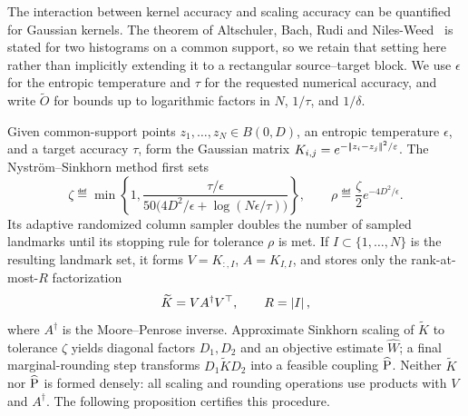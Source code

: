 The interaction between kernel accuracy and scaling accuracy can be quantified for Gaussian kernels. The theorem of Altschuler, Bach, Rudi and Niles-Weed~\cite{AltschulerBachRudiWeed2018QuadraticTransport,AltschulerBachRudiNilesWeed2019NystromSinkhorn} is stated for two histograms on a common support, so we retain that setting here rather than implicitly extending it to a rectangular source--target block. We use \(\epsilon\) for the entropic temperature and \(\tau\) for the requested numerical accuracy, and write \(\widetilde O\) for bounds up to logarithmic factors in \(N\), \(1/\tau\), and \(1/\delta\).

Given common-support points \(z_1,\ldots,z_N\in B(0,D)\), an entropic temperature \(\epsilon\), and a target accuracy \(\tau\), form the Gaussian matrix \(K_{i,j}=e^{-\norm{z_i-z_j}^2/\epsilon}\). The Nystr\"om--Sinkhorn method first sets
\[
	\zeta\eqdef\min\left\{1,
		\frac{\tau/\epsilon}{50\bigl(4D^2/\epsilon+\log(N\epsilon/\tau)\bigr)}\right\},
	\qquad
	\rho\eqdef\frac{\zeta}{2}e^{-4D^2/\epsilon}.
\]
Its adaptive randomized column sampler doubles the number of sampled landmarks until its stopping rule for tolerance \(\rho\) is met. If \(I\subset\{1,\ldots,N\}\) is the resulting landmark set, it forms \(V=K_{:,I}\), \(A=K_{I,I}\), and stores only the rank-at-most-\(R\) factorization
\[
	\widetilde K=VA^\dagger V^\top,
	\qquad R=\abs{I},
\]
where \(A^\dagger\) is the Moore--Penrose inverse. Approximate Sinkhorn scaling of \(\widetilde K\) to tolerance \(\zeta\) yields diagonal factors \(D_1,D_2\) and an objective estimate \(\widehat W\); a final marginal-rounding step transforms \(D_1\widetilde K D_2\) into a feasible coupling \(\widehat{\P}\). Neither \(\widetilde K\) nor \(\widehat{\P}\) is formed densely: all scaling and rounding operations use products with \(V\) and \(A^\dagger\). The following proposition certifies this procedure.

